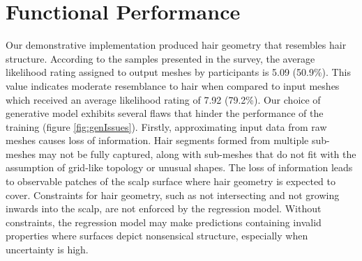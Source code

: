 \documentclass[ %
author={Dillon Keith Diep},
supervisor={Dr. Carl Henrik Ek},
degree={MEng},
title={ART-CG Hair:},
subtitle={Assisted Real-time Content Generation of Stylised Virtual Hair},
type={Research},
year={2017} ]{dissertation}
\begin{document}
	\section{Functional Performance}
	\label{evaluation:functional}
	Our demonstrative implementation produced hair geometry that resembles hair structure. According to the samples presented in the survey, the average likelihood rating assigned to output meshes by participants is 5.09 (50.9\%). This value indicates moderate resemblance to hair when compared to input meshes which received an average likelihood rating of 7.92 (79.2\%). Our choice of generative model exhibits several flaws that hinder the performance of the training (figure \ref{fig:genIssues}). Firstly, approximating input data from raw meshes causes loss of information. Hair segments formed from multiple sub-meshes may not be fully captured, along with sub-meshes that do not fit with the assumption of grid-like topology or unusual shapes. The loss of information leads to observable patches of the scalp surface where hair geometry is expected to cover. Constraints for hair geometry, such as not intersecting and not growing inwards into the scalp, are not enforced by the regression model. Without constraints, the regression model may make predictions containing invalid properties where surfaces depict nonsensical structure, especially when uncertainty is high.
	
\end{document}
